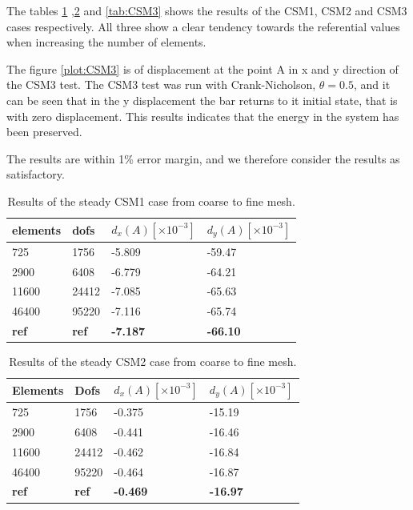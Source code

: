 The tables \ref{tab:CSM1} ,\ref{tab:CSM2} and \ref{tab:CSM3} shows the results of the CSM1, CSM2 and CSM3 cases respectively. All three show a clear tendency towards the referential values when increasing the number of elements. 

The figure \ref{plot:CSM3} is of displacement at the point A in x and y direction of the CSM3 test. The CSM3 test was run with Crank-Nicholson, $\theta = 0.5$, and it can be seen that in the y displacement the bar returns to it initial state, that is with zero displacement. This results indicates that the energy in the system has been preserved.

The results are within 1\% error margin, and we therefore consider the results as satisfactory.

\begin{table}[H]
\centering
\caption{Results of the steady CSM1 case from coarse to fine mesh.}
\label{tab:CSM1}
\begin{tabular}{|l|l|l|l|}
\hline
elements & dofs & $d_x(A) [\times10^{-3}]$ & $d_y(A) [\times10^{-3}]$ \\ \hline
725 & 1756 & -5.809 & -59.47 \\ \hline
2900 & 6408 & -6.779 & -64.21 \\ \hline
11600 & 24412 & -7.085 & -65.63 \\ \hline
46400 & 95220 & -7.116 & -65.74 \\ \hline
\textbf{ref} & \textbf{ref} & \textbf{-7.187} &  \textbf{-66.10} \\ \hline
\end{tabular}
\end{table}

\begin{table}[H]
\centering
\caption{Results of the steady CSM2 case from coarse to fine mesh.}
\label{tab:CSM2}
\begin{tabular}{@{}|l|l|l|l|@{}}
\hline
Elements & Dofs & $d_x(A) [\times10^{-3}] $& $d_y(A) [\times10^{-3}] $\\ \hline
725 &  1756 & -0.375 & -15.19 \\ \hline
2900 & 6408 & -0.441 & -16.46\\ \hline
11600 & 24412 & -0.462 & -16.84 \\ \hline
46400 & 95220 & -0.464 & -16.87\\ \hline
\textbf{ref} & \textbf{ref} &  \textbf{-0.469} &  \textbf{-16.97} \\ \hline
\end{tabular}
\end{table}

